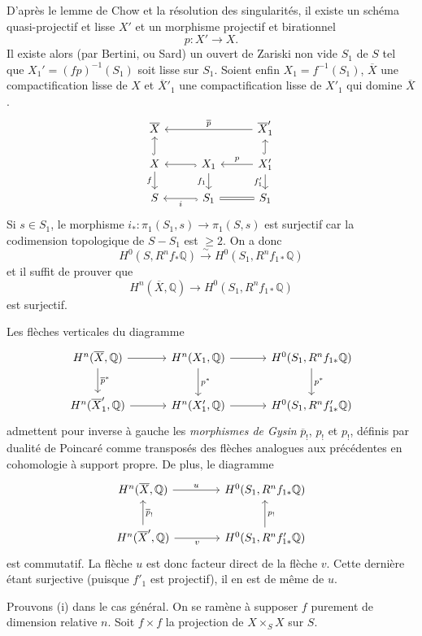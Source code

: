 \documentclass[10pt]{article}
\newcommand{\Q}{\mathbb Q}
\begin{document}
D'après le lemme de Chow et la résolution des singularités, il existe un schéma
quasi-projectif et lisse $X'$ et un morphisme projectif et birationnel
\[
p:X'\longrightarrow X.
\]
Il existe alors (par Bertini, ou Sard) un ouvert de Zariski non vide $S_1$ de $S$ tel que $X_1'=(fp)^{-1}(S_1)$ soit lisse sur $S_1$. Soient enfin $X_1=f^{-1}(S_1)$, $\overline X$ une compactification lisse de $X$ et $\overline X'_1$ une compactification lisse de $X'_1$ qui domine $\overline X$.
\[
\begin{tikzcd}[row sep=1.35em,column sep=2.8em]
\overline X && \overline X'_1 \arrow[ll,"\overline p"']\\
X \arrow[u,hook] \arrow[d,"f"'] & X_1 \arrow[l,hook] \arrow[d,"f_1"'] & X'_1 \arrow[l,"p"'] \arrow[u,hook] \arrow[d,"f'_1"']\\
S & S_1 \arrow[l,hook,"i"] & S_1 \arrow[l,equal]
\end{tikzcd}
\]
Si $s\in S_1$, le morphisme $i_*:\pi_1(S_1,s)\to\pi_1(S,s)$ est surjectif car la codimension topologique de $S-S_1$ est $\ge2$. On a donc
\[
H^0(S,R^nf_*\Q)\xrightarrow{\sim} H^0(S_1,R^nf_{1*}\Q)
\]
et il suffit de prouver que
\[
H^n(\overline X,\Q)\longrightarrow H^0(S_1,R^nf_{1*}\Q)
\]
est surjectif.

Les flèches verticales du diagramme
\[
\begin{tikzcd}[column sep=3.2em,row sep=2.2em]
H^n(\overline X,\Q) \arrow[r] \arrow[d,"\overline p^*"] &
H^n(X_1,\Q) \arrow[r] \arrow[d,"p^*"] &
H^0(S_1,R^nf_{1*}\Q) \arrow[d,"p^*"]\\
H^n(\overline X'_1,\Q) \arrow[r] &
H^n(X'_1,\Q) \arrow[r] &
H^0(S_1,R^nf'_{1*}\Q)
\end{tikzcd}
\]
admettent pour inverse à gauche les \emph{morphismes de Gysin} $\overline p_!$, $p_!$ et $p_!$, définis par dualité de Poincaré comme transposés des flèches analogues aux précédentes en cohomologie à support propre. De plus, le diagramme
\[
\begin{tikzcd}[column sep=4em,row sep=2.2em]
H^n(\overline X,\Q) \arrow[r,"u"] &
H^0(S_1,R^nf_{1*}\Q)\\
H^n(\overline X',\Q) \arrow[u,"\overline p_!"'] \arrow[r,"v"'] &
H^0(S_1,R^nf'_{1*}\Q) \arrow[u,"p_!"']
\end{tikzcd}
\]
est commutatif. La flèche $u$ est donc facteur direct de la flèche $v$. Cette dernière étant surjective (puisque $f'_1$ est projectif), il en est de même de $u$.

Prouvons (i) dans le cas général. On se ramène à supposer $f$ purement de dimension relative $n$. Soit $f\times f$ la projection de $X\times_SX$ sur $S$.
\end{document}

